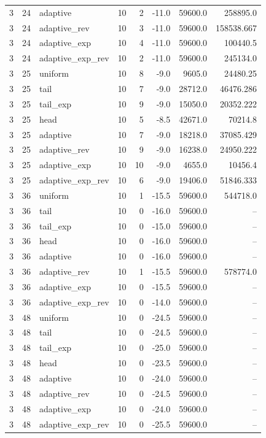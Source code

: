 \begin{tabular}{rrlrrrrr}
3 & 24 & adaptive & 10 & 2 & -11.0 & 59600.0 & 258895.0 \\
3 & 24 & adaptive\_rev & 10 & 3 & -11.0 & 59600.0 & 158538.667 \\
3 & 24 & adaptive\_exp & 10 & 4 & -11.0 & 59600.0 & 100440.5 \\
3 & 24 & adaptive\_exp\_rev & 10 & 2 & -11.0 & 59600.0 & 245134.0 \\
3 & 25 & uniform & 10 & 8 & -9.0 & 9605.0 & 24480.25 \\
3 & 25 & tail & 10 & 7 & -9.0 & 28712.0 & 46476.286 \\
3 & 25 & tail\_exp & 10 & 9 & -9.0 & 15050.0 & 20352.222 \\
3 & 25 & head & 10 & 5 & -8.5 & 42671.0 & 70214.8 \\
3 & 25 & adaptive & 10 & 7 & -9.0 & 18218.0 & 37085.429 \\
3 & 25 & adaptive\_rev & 10 & 9 & -9.0 & 16238.0 & 24950.222 \\
3 & 25 & adaptive\_exp & 10 & 10 & -9.0 & 4655.0 & 10456.4 \\
3 & 25 & adaptive\_exp\_rev & 10 & 6 & -9.0 & 19406.0 & 51846.333 \\
3 & 36 & uniform & 10 & 1 & -15.5 & 59600.0 & 544718.0 \\
3 & 36 & tail & 10 & 0 & -16.0 & 59600.0 & -- \\
3 & 36 & tail\_exp & 10 & 0 & -15.0 & 59600.0 & -- \\
3 & 36 & head & 10 & 0 & -16.0 & 59600.0 & -- \\
3 & 36 & adaptive & 10 & 0 & -16.0 & 59600.0 & -- \\
3 & 36 & adaptive\_rev & 10 & 1 & -15.5 & 59600.0 & 578774.0 \\
3 & 36 & adaptive\_exp & 10 & 0 & -15.5 & 59600.0 & -- \\
3 & 36 & adaptive\_exp\_rev & 10 & 0 & -14.0 & 59600.0 & -- \\
3 & 48 & uniform & 10 & 0 & -24.5 & 59600.0 & -- \\
3 & 48 & tail & 10 & 0 & -24.5 & 59600.0 & -- \\
3 & 48 & tail\_exp & 10 & 0 & -25.0 & 59600.0 & -- \\
3 & 48 & head & 10 & 0 & -23.5 & 59600.0 & -- \\
3 & 48 & adaptive & 10 & 0 & -24.0 & 59600.0 & -- \\
3 & 48 & adaptive\_rev & 10 & 0 & -24.5 & 59600.0 & -- \\
3 & 48 & adaptive\_exp & 10 & 0 & -24.0 & 59600.0 & -- \\
3 & 48 & adaptive\_exp\_rev & 10 & 0 & -25.5 & 59600.0 & -- \\
\hline
\end{tabular}
